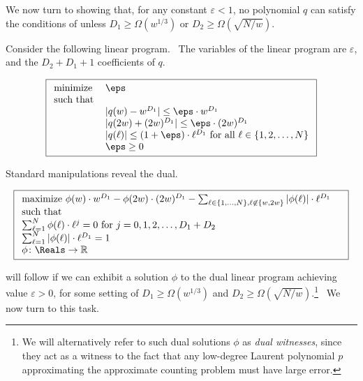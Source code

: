 We now turn to showing that, for any constant $\varepsilon < 1$, no
polynomial $q$ can satisfy the conditions of  unless $D_1 \geq
\Omega(w^{1/3})$ or $D_2 \geq \Omega\left(\sqrt{N/w}\right)$.

Consider the following linear program. \ The variables of the linear program
are $\varepsilon $, and the $D_{2}+D_{1}+1$ coefficients of $q$.

\begin{equation}
\boxed{\begin{array}{ll} \text{minimize } & \eps \\ \mbox{such that} & \\
&|q(w) - w^{D_1}| \leq \eps \cdot w^{D_1}\\ &|q(2w) + (2w)^{D_1}| \leq \eps
\cdot (2w)^{D_1}\\ & |q(\ell)| \leq (1+\eps) \cdot \ell^{D_1} \text{ for all
} \ell \in \{1, 2, \dots, N\}\\ &\eps \geq 0 \end{array}}
\end{equation}

Standard manipulations reveal the dual.

\begin{equation} \label{duallp}
\boxed{\begin{array}{ll} \text{maximize } \phi(w) \cdot w^{D_1} - \phi(2w)
\cdot (2w)^{D_1} - \sum_{\ell \in \{1, \dots, N\}, \ell \not\in \{w, 2w\}}
|\phi(\ell)| \cdot \ell^{D_1} \\ \mbox{such that} & \\ \sum_{\ell=1}^{N}
\phi(\ell) \cdot \ell^j =0 \text{ for } j= 0, 1, 2, \dots, D_1 + D_2 &\\
\sum_{\ell=1}^N |\phi(\ell)| \cdot \ell^{D_1} = 1\\ \phi \colon \Reals \to
\mathbb{R} \end{array}}
\end{equation}

\label{s:duallp}

\medskip\medskip

 will follow if we can exhibit a solution $\phi $ to the dual
linear program achieving value $\varepsilon >0$, for some
setting of $D_{1}\geq \Omega (w^{1/3})$ and $D_{2}\geq \Omega \left( \sqrt{
N/w}\right) $.\footnote{
We will alternatively refer to such dual solutions $\phi $ as \emph{dual
witnesses}, since they act as a witness to the fact that any low-degree
Laurent polynomial $p$ approximating the approximate counting problem must
have large error.} \ We now turn to this task.


